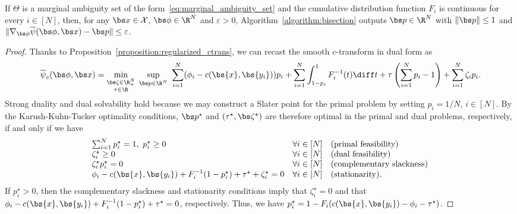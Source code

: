 \documentclass[11pt, a4paper, oneside, reqno]{article}
\begin{document}
	\begin{theorem}
		\label{theorem:bisection}
		If $\Theta$ is a marginal ambiguity set of the form~\eqref{eq:marginal_ambiguity_set} and the cumulative distribution function $F_i$ is continuous for every $i\in[N]$, then, for any $\bs x \in \mathcal X$, $\bs \phi \in \R^N$ and $\varepsilon > 0$, Algorithm~\ref{algorithm:bisection} outputs $\bs p \in \R^N $ with $\| \bs p \| \leq 1$ and $\| \nabla_{\bs \phi} \overline\psi(\bs \phi, \bs x) - {\bs p} \| \leq \varepsilon$.
	\end{theorem}
	\begin{proof}
		Thanks to Proposition~\ref{proposition:regularized_ctrans}, we can recast the smooth $c$-transform in dual form as
		\begin{equation*}
		    \overline \psi_c(\bs \phi, \bs x) = 
		    \min_{\substack{\bs \zeta \in \R_+^N \\ \tau \in \R}}\;\sup_{\bs p \in \R^N} ~ \sum\limits_{i=1}^N (\phi_i - c(\bs {x},\bs {y_i}))p_i +\sum\limits_{i=1}^N \int^1_{1- p_i} F_i^{-1}(t)\diff t + \tau \left(\sum\limits_{i=1}^N p_i - 1 \right)+ \sum\limits_{i=1}^N \zeta_i p_i.
		\end{equation*}
		Strong duality and dual solvability hold because we may construct a Slater point for the primal problem by setting $p_i=1/N$, $i\in[N]$. By the Karush-Kuhn-Tucker optimality conditions, $\bs p^\star$ and $(\tau^\star,\bs \zeta^\star)$ are therefore optimal in the primal and dual problems, respectively, if and only if we have
		\begin{align*}
		    \begin{array}{lll}
		    \sum_{i=1}^N p^\star_i =1, ~p^\star_i \geq 0 & \forall i \in [N] & \text{(primal feasibility)}\\
		    \zeta^\star_i\geq 0 & \forall i \in [N] & \text{(dual feasibility)}\\ \zeta_i^\star p_i^\star=0 & \forall i \in [N] & \text{(complementary slackness)} \\
		    \phi_i-c(\bs {x},\bs {y_i}) + F_i^{-1}(1-p^\star_i) + \tau^\star + \zeta^\star_i = 0 & \forall i \in [N] & \text{(stationarity)}.
		    \end{array}
		\end{align*}
		If $p_i^\star > 0$, then the complementary slackness and stationarity conditions imply that $\zeta_i^\star = 0$ and that $\phi_i-c(\bs {x},\bs {y_i}) + F_i^{-1}(1-p^\star_i) + \tau^\star = 0$, respectively. 
		Thus, we have $p_i^\star = 1 - F_i(c(\bs {x},\bs {y_i})-\phi_i -\tau^\star)$.

\end{proof}
\end{document}
